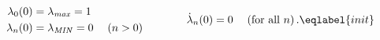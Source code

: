 \begin{equation}
\begin{split}
\lambda_0(0)&=\lambda_{\it max}=1 \\ 
\lambda_n(0)&=\lambda_{\it MIN}=0 \quad\; (n>0)
\end{split}
\qquad\qquad\dot\lambda_n(0)=0 \quad\;\text{(for all $n$)}\,.
\eqlabel{init}
\end{equation} 
